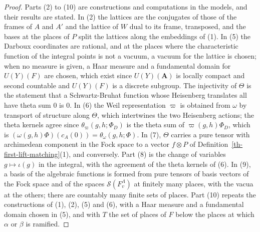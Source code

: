 \begin{proof}
Parts (2) to (10) are constructions and computations in the models, and their
results are stated. In (2) the lattices are the conjugates of those of the
frames of $A$ and $A'$ and the lattice of $W$ dual to its frame, transposed,
and the bases at the places of $P$ split the lattices along the embeddings of
(1). In (5) the Darboux coordinates are rational, and at the places where the
characteristic function of the integral points is not a vacuum, a vacuum for
the lattice is chosen; when no measure is given, a Haar measure and a
fundamental domain for $U(Y)(F)$ are chosen, which exist since
$U(Y)(\mathbf A)$ is locally compact and second countable and $U(Y)(F)$ is a
discrete subgroup. The injectivity of $\Theta$ is the statement that a
Schwartz-Bruhat function whose Heisenberg translates all have theta sum $0$
is $0$. In (6) the Weil representation $\varpi$ is obtained from $\omega$ by
transport of structure along $\Theta$, which intertwines the two Heisenberg
actions; the theta kernels agree since $\theta_\varpi(g,h;\Phi_D)$ is the
theta sum of $\varpi(g,h)\Phi_D$, which is
$(\omega(g,h)\Phi)(c_A(0))=\theta_\omega(g,h;\Phi)$. In (7), $\Theta$ carries
a pure tensor with archimedean component in the Fock space to a vector
$f\otimes P$ of Definition~\ref{th-first-lift-matching}(1), and conversely.
Part (8) is the change of variables $g\mapsto\iota(g)$ in the integral, with
the agreement of the theta kernels of (6). In (9), a basis of the algebraic
functions is formed from pure tensors of basis vectors of the Fock space and of
the spaces $\mathcal S(F_v^\Lambda)$ at finitely many places, with the vacua at
the others; there are countably many finite sets of places. Part (10) repeats
the constructions of (1), (2), (5) and (6), with a Haar measure and a
fundamental domain chosen in (5), and with $T$ the set of places of $F$ below
the places at which $\alpha$ or $\beta$ is ramified.
\end{proof}

